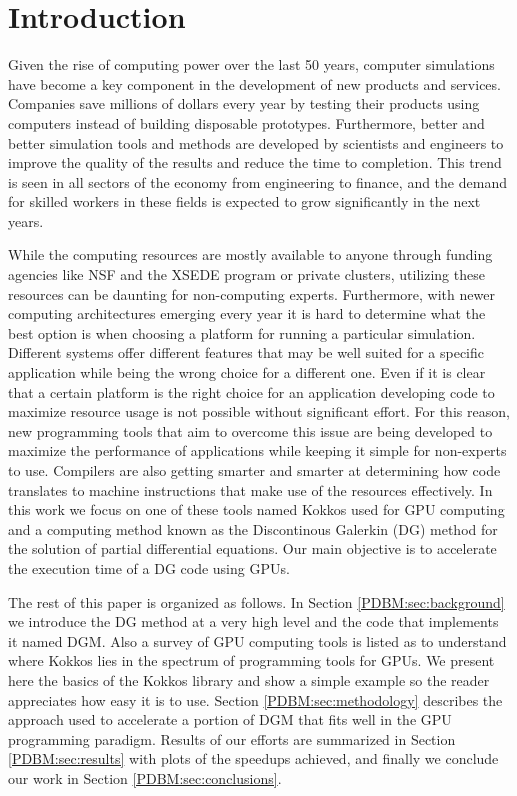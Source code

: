 \documentclass{ccr16}
\begin{document}
    \section{Introduction}
    {
        \label{PDBM:sec:intro}

        Given the rise of computing power over the last 50 years, computer simulations have become a key component in the development of new products and services. Companies save millions of dollars every year by testing their products using computers instead of building disposable prototypes. Furthermore, better and better simulation tools and methods are developed by scientists and engineers to improve the quality of the results and reduce the time to completion. This trend is seen in all sectors of the economy  from engineering to finance, and the demand for skilled workers in these fields is expected to grow significantly in the next years.

        While the computing resources are mostly available to anyone through funding agencies like NSF and the XSEDE program or private clusters, utilizing these resources can be daunting for non-computing experts. Furthermore, with newer computing architectures emerging every year it is hard to determine what the best option is when choosing a platform for running a particular simulation. Different systems offer different features that may be well suited for a specific application while being the wrong choice for a different one. Even if it is clear that a certain platform is the right choice for an application developing code to maximize resource usage is not possible without significant effort. For this reason, new programming tools that aim to overcome this issue are being developed to maximize the performance of applications while keeping it simple for non-experts to use. Compilers are also getting smarter and smarter at determining how code translates to machine instructions that make use of the resources effectively. In this work we focus on one of these tools named Kokkos used for GPU computing and a computing method known as the Discontinous Galerkin (DG) method for the solution of partial differential equations. Our main objective is to accelerate the execution time of a DG code using GPUs.

        The rest of this paper is organized as follows. In Section \ref{PDBM:sec:background} we introduce the DG method at a very high level and the code that implements it named DGM. Also a survey of GPU computing tools is listed as to understand where Kokkos lies in the spectrum of programming tools for GPUs. We present here the basics of the Kokkos library and show a simple example so the reader appreciates how easy it is to use. Section \ref{PDBM:sec:methodology} describes the approach used to accelerate a portion of DGM that fits well in the GPU programming paradigm. Results of our efforts are summarized in Section \ref{PDBM:sec:results} with plots of the speedups achieved, and finally we conclude our work in Section \ref{PDBM:sec:conclusions}.
    }
\end{document}
